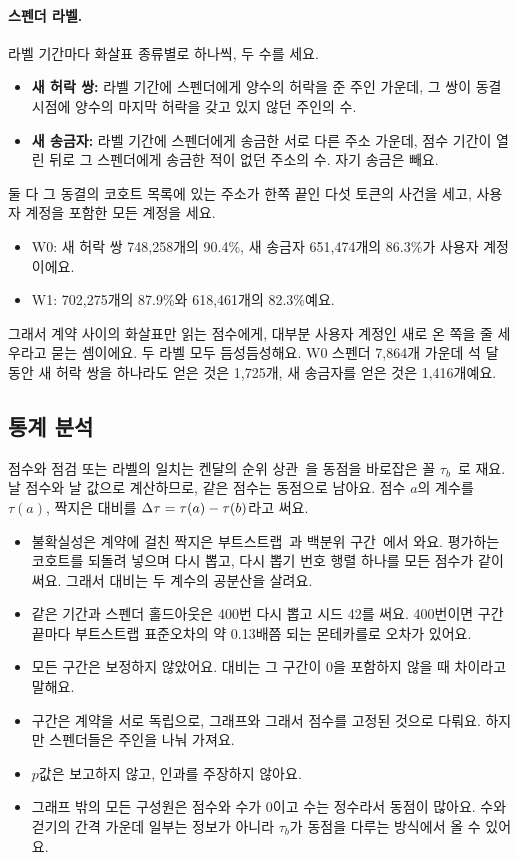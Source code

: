 \paragraph{스펜더 라벨.}
라벨 기간마다 화살표 종류별로 하나씩, 두 수를 세요.
\begin{itemize}
\item \textbf{새 허락 쌍:} 라벨 기간에 스펜더에게 양수의 허락을 준 주인 가운데, 그 쌍이 동결 시점에 양수의 마지막 허락을 갖고 있지 않던 주인의 수.
\item \textbf{새 송금자:} 라벨 기간에 스펜더에게 송금한 서로 다른 주소 가운데, 점수 기간이 열린 뒤로 그 스펜더에게 송금한 적이 없던 주소의 수. 자기 송금은 빼요.
\end{itemize}
둘 다 그 동결의 코호트 목록에 있는 주소가 한쪽 끝인 다섯 토큰의 사건을 세고, 사용자 계정을 포함한 모든 계정을 세요.
\begin{itemize}
\item W0: 새 허락 쌍 748,258개의 90.4\%, 새 송금자 651,474개의 86.3\%가 사용자 계정이에요.
\item W1: 702,275개의 87.9\%와 618,461개의 82.3\%예요.
\end{itemize}
그래서 계약 사이의 화살표만 읽는 점수에게, 대부분 사용자 계정인 새로 온 쪽을 줄 세우라고 묻는 셈이에요. 두 라벨 모두 듬성듬성해요. W0 스펜더 7,864개 가운데 석 달 동안 새 허락 쌍을 하나라도 얻은 것은 1,725개, 새 송금자를 얻은 것은 1,416개예요.

\subsection{통계 분석}

점수와 점검 또는 라벨의 일치는 켄달의 순위 상관~\cite{kendall1938rank}을 동점을 바로잡은 꼴 $\tau_b$~\cite{kendall1945ties}로 재요. 날 점수와 날 값으로 계산하므로, 같은 점수는 동점으로 남아요. 점수 $a$의 계수를 $\tau(a)$, 짝지은 대비를 $\Delta\tau=\tau(a)-\tau(b)$라고 써요.
\begin{itemize}
\item 불확실성은 계약에 걸친 짝지은 부트스트랩~\cite{efron1979bootstrap}과 백분위 구간~\cite{diciccio1996bootstrap}에서 와요. 평가하는 코호트를 되돌려 넣으며 다시 뽑고, 다시 뽑기 번호 행렬 하나를 모든 점수가 같이 써요. 그래서 대비는 두 계수의 공분산을 살려요.
\item 같은 기간과 스펜더 홀드아웃은 400번 다시 뽑고 시드 42를 써요. 400번이면 구간 끝마다 부트스트랩 표준오차의 약 0.13배쯤 되는 몬테카를로 오차가 있어요.
\item 모든 구간은 보정하지 않았어요. 대비는 그 구간이 0을 포함하지 않을 때 차이라고 말해요.
\item 구간은 계약을 서로 독립으로, 그래프와 그래서 점수를 고정된 것으로 다뤄요. 하지만 스펜더들은 주인을 나눠 가져요.
\item $p$값은 보고하지 않고, 인과를 주장하지 않아요.
\item 그래프 밖의 모든 구성원은 점수와 수가 0이고 수는 정수라서 동점이 많아요. 수와 걷기의 간격 가운데 일부는 정보가 아니라 $\tau_b$가 동점을 다루는 방식에서 올 수 있어요.
\end{itemize}


